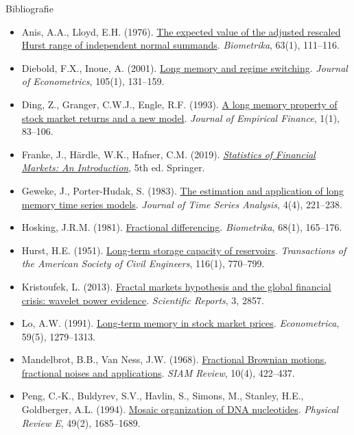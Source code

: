 \begin{frame}{Bibliografie}
\itemsize{\tiny}
\begin{itemize}
    \item Anis, A.A., Lloyd, E.H. (1976). \href{https://doi.org/10.1093/biomet/63.1.111}{The expected value of the adjusted rescaled Hurst range of independent normal summands}. \textit{Biometrika}, 63(1), 111--116.
    \item Diebold, F.X., Inoue, A. (2001). \href{https://doi.org/10.1016/S0304-4076(01)00073-2}{Long memory and regime switching}. \textit{Journal of Econometrics}, 105(1), 131--159.
    \item Ding, Z., Granger, C.W.J., Engle, R.F. (1993). \href{https://doi.org/10.1016/0927-5398(93)90006-D}{A long memory property of stock market returns and a new model}. \textit{Journal of Empirical Finance}, 1(1), 83--106.
    \item Franke, J., Härdle, W.K., Hafner, C.M. (2019). \href{https://doi.org/10.1007/978-3-030-13751-9}{\textit{Statistics of Financial Markets: An Introduction}}, 5th ed. Springer.
    \item Geweke, J., Porter-Hudak, S. (1983). \href{https://doi.org/10.1111/j.1467-9892.1983.tb00371.x}{The estimation and application of long memory time series models}. \textit{Journal of Time Series Analysis}, 4(4), 221--238.
    \item Hosking, J.R.M. (1981). \href{https://doi.org/10.1093/biomet/68.1.165}{Fractional differencing}. \textit{Biometrika}, 68(1), 165--176.
    \item Hurst, H.E. (1951). \href{https://doi.org/10.1061/TACEAT.0006518}{Long-term storage capacity of reservoirs}. \textit{Transactions of the American Society of Civil Engineers}, 116(1), 770--799.
    \item Kristoufek, L. (2013). \href{https://doi.org/10.1038/srep02857}{Fractal markets hypothesis and the global financial crisis: wavelet power evidence}. \textit{Scientific Reports}, 3, 2857.
    \item Lo, A.W. (1991). \href{https://doi.org/10.2307/2938368}{Long-term memory in stock market prices}. \textit{Econometrica}, 59(5), 1279--1313.
    \item Mandelbrot, B.B., Van Ness, J.W. (1968). \href{https://doi.org/10.1137/1010093}{Fractional Brownian motions, fractional noises and applications}. \textit{SIAM Review}, 10(4), 422--437.
    \item Peng, C.-K., Buldyrev, S.V., Havlin, S., Simons, M., Stanley, H.E., Goldberger, A.L. (1994). \href{https://doi.org/10.1103/PhysRevE.49.1685}{Mosaic organization of DNA nucleotides}. \textit{Physical Review E}, 49(2), 1685--1689.

\end{itemize}
\end{frame}
